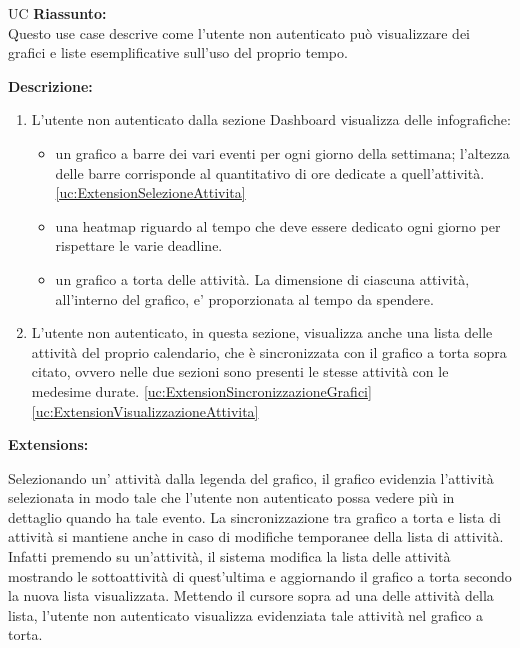 \begin{listaPersonale}{UC}
    \textbf{Riassunto:} \\
    Questo use case descrive come l'utente non autenticato può visualizzare dei grafici e liste esemplificative sull'uso del proprio tempo.

    \textbf{Descrizione:}
    \begin{enumerate}
        \item L'utente non autenticato dalla sezione Dashboard visualizza delle infografiche:
              \begin{itemize}
                  \item un grafico a barre dei vari eventi per ogni giorno della settimana; l'altezza delle barre corrisponde al quantitativo di ore dedicate a quell'attività. \ref{uc:ExtensionSelezioneAttivita}
                  \item una heatmap riguardo al tempo che deve essere dedicato ogni giorno per rispettare le varie deadline.
                  \item un grafico a torta delle attività. La dimensione di ciascuna attività, all'interno del grafico, e' proporzionata al tempo da spendere.
              \end{itemize}
        \item L'utente non autenticato, in questa sezione, visualizza anche una lista delle attività del proprio calendario, che è sincronizzata con il grafico a torta sopra citato, ovvero nelle due sezioni sono presenti le stesse attività con le medesime durate. \ref{uc:ExtensionSincronizzazioneGrafici} \ref{uc:ExtensionVisualizzazioneAttivita}
    \end{enumerate}

    \textbf{Extensions:}
    \begin{enumerate}[label=\textbf{[extension \arabic{enumii}]}, ref= \textbf{[extension \arabic{enumii}]}]
         Selezionando un' attività dalla legenda del grafico, il grafico evidenzia l'attività selezionata in modo tale che l'utente non autenticato possa vedere più in dettaglio quando ha tale evento.
         La sincronizzazione tra grafico a torta e lista di attività si mantiene anche in caso di modifiche temporanee della lista di attività. Infatti premendo su un'attività, il sistema modifica la lista delle attività mostrando le sottoattività di quest'ultima e aggiornando il grafico a torta secondo la nuova lista visualizzata.
         Mettendo il cursore sopra ad una delle attività della lista, l'utente non autenticato visualizza evidenziata tale attività nel grafico a torta.
    \end{enumerate}





\end{listaPersonale}
